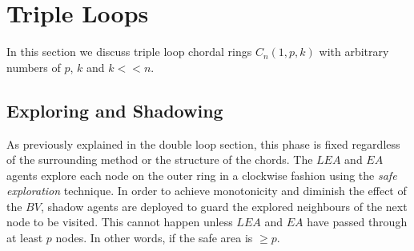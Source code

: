  



\section{Triple Loops}
In this section we discuss triple loop chordal rings $C_n(1,p,k)$ with arbitrary numbers of $p$, $k$ and $k<<n$.
\subsection{Exploring and Shadowing}

As previously explained in the double loop section, this phase is fixed regardless of the surrounding method or the structure of the chords.
The $LEA$ and $EA$ agents explore each node on the outer ring in a clockwise fashion  using the {\em safe exploration} technique.
In order to achieve monotonicity and  diminish the effect of the $BV$,  shadow agents are deployed to guard the explored neighbours of the next node to be visited. This cannot happen unless $LEA$ and $EA$ have passed through at least $p$ nodes. In other words, if the safe area is $\ge p$. 
  
